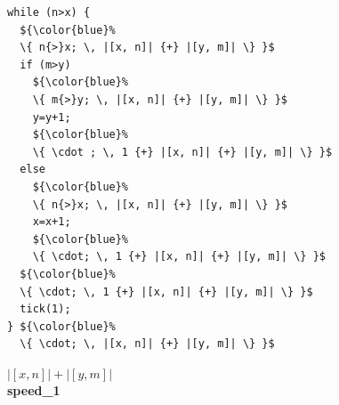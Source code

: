 \documentclass{sigplanconf}
\begin{document}
\begin{figure}
 \setlength{\progwidth}{.22\linewidth}
  \centering
\vspace{-.3cm}
\hspace{-0.4cm}
  \begin{minipage}[b]{.18\linewidth}
    \begin{center}
   \begin{lstlisting}[]
while (n>x) {
  ${\color{blue}%
  \{ n{>}x; \, |[x, n]| {+} |[y, m]| \} }$
  if (m>y)
    ${\color{blue}%
    \{ m{>}y; \, |[x, n]| {+} |[y, m]| \} }$
    y=y+1;
    ${\color{blue}%
    \{ \cdot ; \, 1 {+} |[x, n]| {+} |[y, m]| \} }$
  else
    ${\color{blue}%
    \{ n{>}x; \, |[x, n]| {+} |[y, m]| \} }$
    x=x+1;
    ${\color{blue}%
    \{ \cdot; \, 1 {+} |[x, n]| {+} |[y, m]| \} }$
  ${\color{blue}%
  \{ \cdot; \, 1 {+} |[x, n]| {+} |[y, m]| \} }$
  tick(1);
} ${\color{blue}%
  \{ \cdot; \, |[x, n]| {+} |[y, m]| \} }$
   \end{lstlisting}
\vspace{-2.5ex}
$|[x, n]| + |[y, m]|$
\\[.4\baselineskip]
      {\bf speed\_1}
    \end{center}
  \end{minipage}
%
\hfill
%
  \begin{minipage}[b]{\progwidth}
    \begin{center}
   \begin{lstlisting}


\end{lstlisting}
\end{center}
\end{minipage}
\end{figure}
\end{document}
